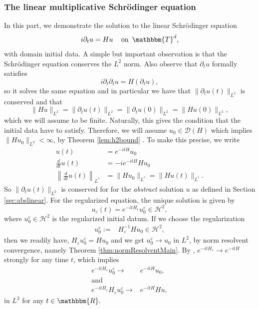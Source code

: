 \documentclass[11pt, oneside]{article}   	%
\newcommand{\assign}{:=}
\newcommand{\tmop}[1]{\ensuremath{\operatorname{#1}}}
\newcommand{\tmtextit}[1]{{\itshape{#1}}}
\newcommand{\ssp}{\mathscr{H}}
\begin{document}
\subsubsection{The linear multiplicative
	Schr\"odinger equation}\label{sec:linschr}
In this part, we demonstrate the solution to the linear Schr\"odinger equation  
\begin{equation}
i \partial_t u = H u \quad \tmop{on}  \ \mathbbm{T}^d,
\end{equation}
with domain initial data.
A simple but  important observation is that the Schr{\"o}dinger
equation conserves the $L^2$ norm. Also observe that $\partial_t u$ formally
satisfies
\[ i \partial_t \partial_t u = H (\partial_t u), \]
so it solves the same equation and in particular we
have that $\| \partial_t u (t) \|_{L^2}$ is conserved and that
\[ \| H u \|_{L^2} = \| \partial_t u (t) \|_{L^2} = \| \partial_t u (0)
\|_{L^2} = \| H u (0) \|_{L^2}, \]
which we will assume to be finite. Naturally, this gives the condition that
the  initial data have to satisfy.   Therefore, we will assume $u_0 \in \mathscr{D}(H)$  which implies  $\| H u_0
\|_{L^2} < \infty$,  by Theorem \ref{lem:h2bound} . 
To make this precise, we write
\begin{align*}
u (t)  &=  e^{{-i t H}} u_0\\
\frac{d}{d t} u (t)  &= -i e^{{-i t H}} H u_0\\
\left\| \frac{d}{d t} u (t) \right\|_{L^{^2}}  &=  \| H u_0 \|_{L^{^2}}
=  \| H u (t) \|_{L^{^2}} .
\end{align*}
So $\| \partial_t u (t) \|_{L^2}$ is conserved for for the \tmtextit{abstract}
solution $u$ as defined in Section \ref{sec:abslinear}. For the regularized
equation, the unique solution is given by
\[ u_{\varepsilon} (t) = e^{-i t H_{\varepsilon}} u^{\varepsilon}_0 \in \ssp^2, \]
where $u^{\varepsilon}_0 \in \ssp^2$ is the regularized initial datum. If we
choose the regularization
\begin{align*}
u^{\varepsilon}_0  \assign &  H_{\varepsilon}^{- 1}  H u_0 \in
\ssp^2, \end{align*}
then we readily have,
$
H_{\varepsilon} u^{\varepsilon}_0  =  H u_0
$
and we get $u^{\varepsilon}_0 \rightarrow u_0$ in $L^2$,  by norm resolvent convergence, namely Theorem \ref{thm:normResolventMain}.
By  \cite[Theorem VIII.21]{reedsimon1}, $e^{-i t H_{\varepsilon}} \rightarrow
e^{-i t H}$ strongly for any time $t$, which implies
\begin{align*}
e^{-i t H_{\varepsilon}} u^{\varepsilon}_0  \rightarrow & e^{-i t H} u_0,\\
\tmop{and} & \\
e^{-i t H_{\varepsilon}} H_{\varepsilon} u^{\varepsilon}_0  \rightarrow &
e^{-i t H} H u,
\end{align*}
in $L^2$ for any $t \in \mathbbm{R}.$
\end{document}
